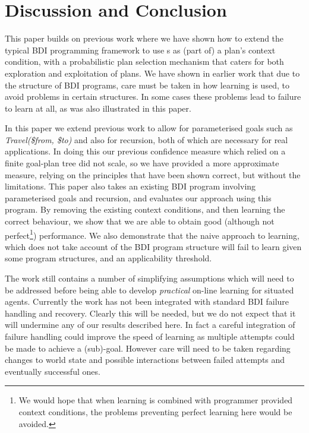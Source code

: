 \section{Discussion and Conclusion}\label{sec:discussion}

This paper builds on previous work where we have shown how to extend
the typical BDI programming framework to use \dt{}s as (part of) a
plan's context condition, with a probabilistic plan selection
mechanism that caters for both exploration and exploitation of plans.
We have shown in earlier work that due to the structure of BDI
programs, care must be taken in how learning is used, to avoid
problems in certain structures. In some cases these problems lead to
failure to learn at all, as was also illustrated in this paper.

In this paper we extend previous work to allow for parameterised
goals such as {\it Travel(\$from, \$to)} and also for recursion, both
of which are necessary for real applications. In doing this our
previous confidence measure which relied on a finite goal-plan tree
did not scale, so we have provided a more approximate measure, relying
on the principles that have been shown correct, but without the
limitations. This paper also takes an existing BDI program involving
parameterised goals and recursion, and evaluates our approach using
this program. By removing the existing context conditions, and then
learning the correct behaviour, we show that we are able to obtain
good (although not perfect\footnote{We would hope that when learning
is combined with programmer provided context conditions, the problems
preventing perfect learning here would be avoided.}) performance. We
also demonstrate that the naive approach to learning, which does not
take account of the BDI program structure will fail to learn given
some program structures, and an applicability threshold.

The work still contains a number of simplifying assumptions which will
need to be addressed before being able to develop {\it practical} on-line
learning for situated agents. Currently the work has not been
integrated with standard BDI failure handling and recovery. Clearly
this will be needed, but we do not expect that it will undermine any
of our results described here. In fact a careful integration of
failure handling could improve the speed of learning as multiple
attempts could be made to achieve a (sub)-goal. However care will need
to be taken regarding changes to world state and possible interactions
between failed attempts and eventually successful ones.


